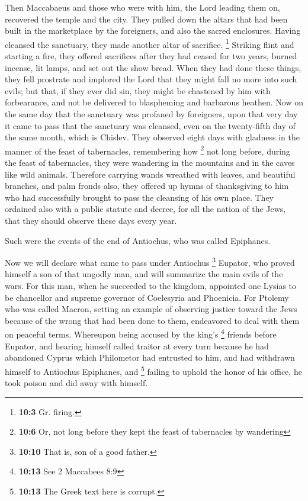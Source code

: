  Then Maccabaeus and those who were with him, the Lord
leading them on, recovered the temple and the city.  They
pulled down the altars that had been built in the marketplace by the
foreigners, and also the sacred enclosures.  Having
cleansed the sanctuary, they made another altar of sacrifice.
\footnote{\textbf{10:3} Gr. firing.} Striking flint and starting a fire,
they offered sacrifices after they had ceased for two years, burned
incense, lit lamps, and set out the show bread.  When they
had done these things, they fell prostrate and implored the Lord that
they might fall no more into such evils; but that, if they ever did sin,
they might be chastened by him with forbearance, and not be delivered to
blaspheming and barbarous heathen.  Now on the same day
that the sanctuary was profaned by foreigners, upon that very day it
came to pass that the sanctuary was cleansed, even on the twenty-fifth
day of the same month, which is Chislev.  They observed
eight days with gladness in the manner of the feast of tabernacles,
remembering how \footnote{\textbf{10:6} Or, not long before they kept
  the feast of tabernacles by wandering} not long before, during the
feast of tabernacles, they were wandering in the mountains and in the
caves like wild animals.  Therefore carrying wands
wreathed with leaves, and beautiful branches, and palm fronds also, they
offered up hymns of thanksgiving to him who had successfully brought to
pass the cleansing of his own place.  They ordained also
with a public statute and decree, for all the nation of the Jews, that
they should observe these days every year.

 Such were the events of the end of Antiochus, who was
called Epiphanes.

 Now we will declare what came to pass under Antiochus
\footnote{\textbf{10:10} That is, son of a good father.} Eupator, who
proved himself a son of that ungodly man, and will summarize the main
evils of the wars.  For this man, when he succeeded to
the kingdom, appointed one Lysias to be chancellor and supreme governor
of Coelesyria and Phoenicia.  For Ptolemy who was called
Macron, setting an example of observing justice toward the Jews because
of the wrong that had been done to them, endeavored to deal with them on
peaceful terms.  Whereupon being accused by the king's
\footnote{\textbf{10:13} See 2 Maccabees 8:9} friends before Eupator,
and hearing himself called traitor at every turn because he had
abandoned Cyprus which Philometor had entrusted to him, and had
withdrawn himself to Antiochus Epiphanes, and \footnote{\textbf{10:13}
  The Greek text here is corrupt.} failing to uphold the honor of his
office, he took poison and did away with himself.

